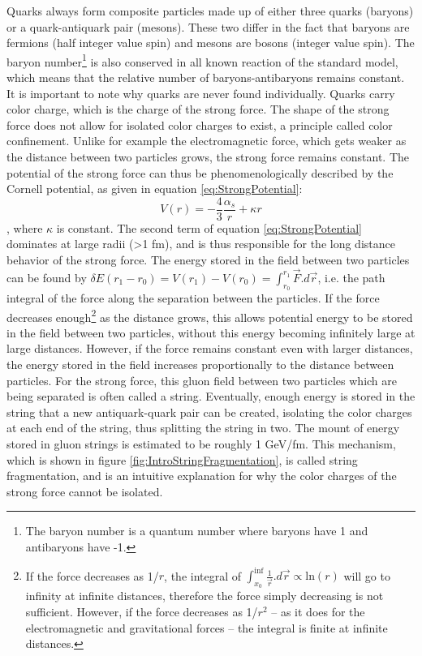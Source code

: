 Quarks always form composite particles made up of either three quarks (baryons) or a quark-antiquark pair (mesons). %
These two differ in the fact that baryons are fermions (half integer value spin) and mesons are bosons (integer value spin). The baryon number\footnote{The baryon number is a quantum number where baryons have 1 and antibaryons have -1.} is also conserved in all known reaction of the standard model, which means that the relative number of baryons-antibaryons remains constant. \\
It is important to note why quarks are never found individually. Quarks carry color charge, which is the charge of the strong force. The shape of the strong force does not allow for isolated color charges to exist, a principle called  color confinement. Unlike for example the electromagnetic force, which gets weaker as the distance between two particles grows, the strong force remains constant. The potential of the strong force can thus be phenomenologically described by the Cornell potential\cite{Strong_potential}, as given in equation \ref{eq:StrongPotential}:
\begin{equation}\label{eq:StrongPotential}
    V(r) = -\frac{4}{3}\frac{\alpha_s}{r}+\kappa r
\end{equation}
, where $\kappa$ is constant. The second term of equation \ref{eq:StrongPotential} dominates at large radii (>1 fm), and is thus responsible for the long distance behavior of the strong force. The energy stored in the field between two particles can be found by $\delta E(r_1-r_0) = V(r_1)-V(r_0) = \int_{r_0}^{r_1} \vec{F}.d\vec{r}$, i.e. the path integral of the force along the separation between the particles. If the force decreases enough\footnote{If the force decreases as 1/$r$, the integral of $\int_{x_0}^{\inf} \frac{1}{\vec{r} } .d\vec{r} \propto \mathrm{ln}(r)$ will go to infinity at infinite distances, therefore the force simply decreasing is not sufficient. However, if the force decreases as 1/$r^2$ -- as it does for the electromagnetic and gravitational forces -- the integral is finite at infinite distances.} as the distance grows, this allows potential energy to be stored in the field between two particles, without this energy becoming infinitely large at large distances. However, if the force remains constant even with larger distances, the energy stored in the field increases proportionally to the distance between particles. For the strong force, this gluon field between two particles which are being separated is often called a string. Eventually, enough energy is stored in the string that a new antiquark-quark pair can be created, isolating the color charges at each end of the string, thus splitting the string in two. The mount of energy stored in gluon strings is estimated to be roughly 1 GeV/fm\cite{}. This mechanism, which is shown in figure \ref{fig:IntroStringFragmentation}, is called string fragmentation, and is an intuitive explanation for why the color charges of the strong force cannot be isolated. \\

